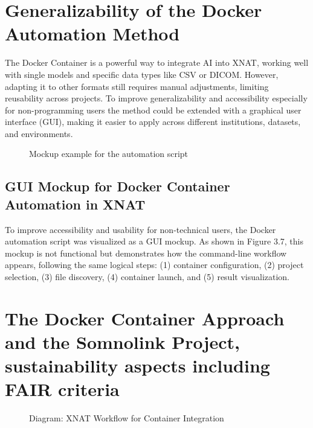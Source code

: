 \section{Generalizability of the Docker Automation Method}
The Docker Container is a powerful way to integrate AI into XNAT, working well with single models and specific data types like CSV or DICOM. However, adapting it to other formats still requires manual adjustments, limiting reusability across projects. To improve generalizability and accessibility especially for non-programming users the method could be extended with a graphical user interface (GUI), making it easier to apply across different institutions, datasets, and environments. 
\begin{figure}[H]
    \centering
    \def\svgwidth{\linewidth} 
    
    \caption{Mockup example for the automation script}
    \label{fig:workflowxnat}
\end{figure}

\subsection{GUI Mockup for Docker Container Automation in XNAT}

To improve accessibility and usability for non-technical users, the Docker automation script was visualized as a GUI mockup. As shown in Figure 3.7, this mockup is not functional but demonstrates how the command-line workflow appears, following the same logical steps: (1) container configuration, (2) project selection, (3) file discovery, (4) container launch, and (5) result visualization.

\section{The Docker Container Approach and the Somnolink Project, sustainability aspects including FAIR criteria}
\begin{figure}[H]
    \centering
    \def\svgwidth{\linewidth} 
    
    \caption{Diagram: XNAT Workflow for Container Integration}
    \label{fig:workflowxnat}
\end{figure}

